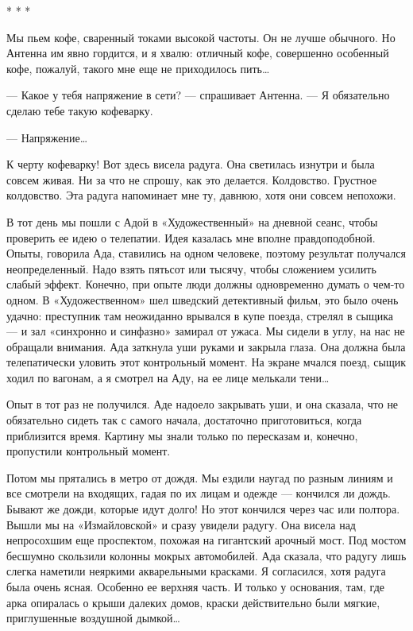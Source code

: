                                      * * *

   Мы пьем кофе, сваренный токами высокой  частоты. Он не лучше обычного.  Но
   Антенна им явно гордится, и  я хвалю: отличный кофе, совершенно  особенный
   кофе, пожалуй, такого мне еще не приходилось пить…

   — Какое у тебя  напряжение в сети? —  спрашивает Антенна. — Я  обязательно
   сделаю тебе такую кофеварку.

   — Напряжение…

   К черту кофеварку! Вот здесь висела  радуга. Она светилась изнутри и  была
   совсем живая. Ни за что не спрошу, как это делается. Колдовство.  Грустное
   колдовство.  Эта  радуга  напоминает  мне  ту,  давнюю,  хотя  они  совсем
   непохожи.

   В тот день  мы пошли  с Адой в  «Художественный» на  дневной сеанс,  чтобы
   проверить ее идею  о телепатии. Идея  казалась мне вполне  правдоподобной.
   Опыты, говорила  Ада,  ставились  на  одном  человеке,  поэтому  результат
   получался неопределенный. Надо взять  пятьсот или тысячу, чтобы  сложением
   усилить слабый эффект. Конечно, при опыте люди должны одновременно  думать
   о чем-то одном.  В «Художественном»  шел шведский  детективный фильм,  это
   было очень  удачно:  преступник там  неожиданно  врывался в  купе  поезда,
   стрелял в  сыщика —  и зал  «синхронно и  синфазно» замирал  от ужаса.  Мы
   сидели в углу,  на нас  не обращали внимания.  Ада заткнула  уши руками  и
   закрыла глаза.  Она должна  была  телепатически уловить  этот  контрольный
   момент. На экране  мчался поезд, сыщик  ходил по вагонам,  а я смотрел  на
   Аду, на ее лице мелькали тени…

   Опыт в тот раз не получился. Аде надоело закрывать уши, и она сказала, что
   не обязательно сидеть так с самого начала, достаточно приготовиться, когда
   приблизится время.  Картину  мы знали  только  по пересказам  и,  конечно,
   пропустили контрольный момент.

   Потом мы прятались в метро от дождя.  Мы ездили наугад по разным линиям  и
   все смотрели на входящих, гадая по их лицам и одежде — кончился ли  дождь.
   Бывают же  дожди, которые  идут  долго! Но  этот  кончился через  час  или
   полтора. Вышли мы на «Измайловской» и сразу увидели радугу. Она висела над
   непросохшим еще проспектом, похожая на гигантский арочный мост. Под мостом
   бесшумно скользили  колонны мокрых  автомобилей. Ада  сказала, что  радугу
   лишь слегка наметили  неяркими акварельными красками.  Я согласился,  хотя
   радуга была очень ясная. Особенно ее верхняя часть. И только у  основания,
   там, где арка опиралась о  крыши далеких домов, краски действительно  были
   мягкие, приглушенные воздушной дымкой…

